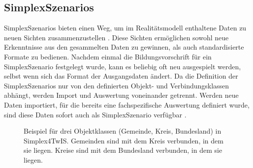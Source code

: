 \subsection{SimplexSzenarios}
\label{sec:simplex-scenarios}

SimplexSzenarios bieten einen Weg, um im Realitätsmodell enthaltene Daten zu neuen Sichten zusammenzustellen \parencite{grossmannEnvVisioUniverselle2021}. Diese Sichten ermöglichen sowohl neue Erkenntnisse aus den gesammelten Daten zu gewinnen, als auch standardisierte Formate zu bedienen. Nachdem einmal die Bildungsvorschrift für ein SimplexSzenario festgelegt wurde, kann es beliebig oft neu ausgespielt werden, selbst wenn sich das Format der Ausgangsdaten ändert. Da die Definition der SimplexSzenarios nur von den definierten Objekt- und Verbindungsklassen abhängt, werden Import und Auswertung voneinander getrennt. Werden neue Daten importiert, für die bereits eine fachspezifische Auswertung definiert wurde, sind diese Daten sofort auch als SimplexSzenario verfügbar \parencite{rudolfUmweltdatenIntelligenz2021}.

\begin{figure}[!ht]
  \centering
  \caption[Drei Objektklassen in Simplex4TwIS]{Beispiel für drei Objektklassen (Gemeinde, Kreis, Bundesland) in Simplex4TwIS. Gemeinden sind mit dem Kreis verbunden, in dem sie liegen. Kreise sind mit dem Bundesland verbunden, in dem sie liegen.}
  \label{fig:s4d-szenario-example}
\end{figure}

